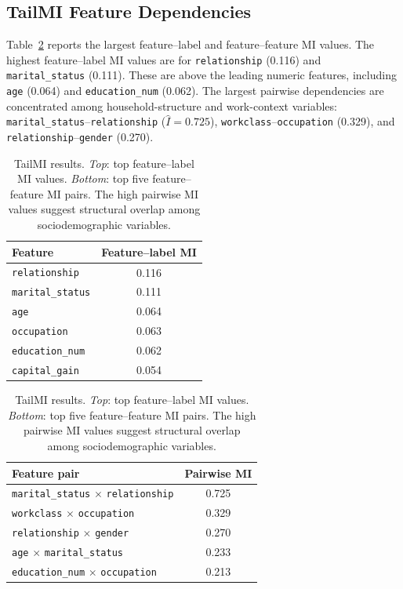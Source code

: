 \documentclass[11pt]{article}
\begin{document}
\subsection{TailMI Feature Dependencies}
\label{sec:tailmi_results}

Table~\ref{tab:tailmi} reports the largest feature--label and feature--feature MI values. The highest feature--label MI values are for \texttt{relationship} (0.116) and \texttt{marital\_status} (0.111). These are above the leading numeric features, including \texttt{age} (0.064) and \texttt{education\_num} (0.062). The largest pairwise dependencies are concentrated among household-structure and work-context variables: \texttt{marital\_status}--\texttt{relationship} ($\hat{I} = 0.725$), \texttt{workclass}--\texttt{occupation} (0.329), and \texttt{relationship}--\texttt{gender} (0.270).

\begin{table}[!ht]
  \centering
  \small
  \begin{tabular}{lc}
    \toprule
    \textbf{Feature} & \textbf{Feature--label MI} \\
    \midrule
    \texttt{relationship}    & 0.116 \\
    \texttt{marital\_status} & 0.111 \\
    \texttt{age}             & 0.064 \\
    \texttt{occupation}      & 0.063 \\
    \texttt{education\_num}  & 0.062 \\
    \texttt{capital\_gain}   & 0.054 \\
    \bottomrule
  \end{tabular}

  \vspace{0.8em}

  \begin{tabular}{lc}
    \toprule
    \textbf{Feature pair} & \textbf{Pairwise MI} \\
    \midrule
    \texttt{marital\_status} $\times$ \texttt{relationship} & 0.725 \\
    \texttt{workclass} $\times$ \texttt{occupation}         & 0.329 \\
    \texttt{relationship} $\times$ \texttt{gender}          & 0.270 \\
    \texttt{age} $\times$ \texttt{marital\_status}          & 0.233 \\
    \texttt{education\_num} $\times$ \texttt{occupation}    & 0.213 \\
    \bottomrule
  \end{tabular}
  \caption{TailMI results.  \textit{Top}: top feature--label MI
    values.  \textit{Bottom}: top five feature--feature MI pairs.
    The high pairwise MI values suggest structural overlap among
    sociodemographic variables.}
  \label{tab:tailmi}
\end{table}
\end{document}

